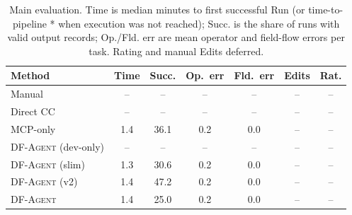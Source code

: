 \begin{table}[t]
\centering
\small
\setlength{\tabcolsep}{3pt}
\begin{tabular}{lcccccc}
\toprule
Method & Time & Succ. & Op.\ err & Fld.\ err & Edits & Rat. \\
\midrule
Manual & -- & -- & -- & -- & -- & -- \\
Direct CC & -- & -- & -- & -- & -- & -- \\
MCP-only & 1.4 & 36.1 & 0.2 & 0.0 & -- & -- \\
\textsc{DF-Agent} (dev-only) & -- & -- & -- & -- & -- & -- \\
\textsc{DF-Agent} (slim) & 1.3 & 30.6 & 0.2 & 0.0 & -- & -- \\
\textsc{DF-Agent} (v2) & 1.4 & 47.2 & 0.2 & 0.0 & -- & -- \\
\textsc{DF-Agent} & 1.4 & 25.0 & 0.2 & 0.0 & -- & -- \\
\bottomrule
\end{tabular}
\caption{Main evaluation. Time is median minutes to first successful Run (or time-to-pipeline * when execution was not reached); Succ. is the share of runs with valid output records; Op./Fld. err are mean operator and field-flow errors per task. Rating and manual Edits deferred.}
\label{tab:eval}
\end{table}
